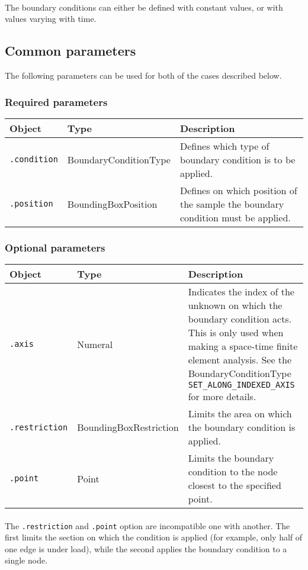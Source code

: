 \documentclass[10pt]{article}
\begin{document}
\paragraph{} The boundary conditions can either be defined with constant values, or with values varying with time.

\subsection{Common parameters}

The following parameters can be used for both of the cases described below.

\subsubsection*{Required parameters}

\begin{tabularx}{\textwidth}{llX}
\hline 
Object & Type & Description \\ 
\hline 
\verb+.condition+ & BoundaryConditionType & Defines which type of boundary condition is to be applied. \\ 
\verb+.position+ & BoundingBoxPosition & Defines on which position of the sample the boundary condition must be applied.\\ 
\hline 
\end{tabularx}

\subsubsection*{Optional parameters}

\begin{tabularx}{\textwidth}{llX}
\hline 
Object & Type & Description \\ 
\hline 
\verb+.axis+ & Numeral & Indicates the index of the unknown on which the boundary condition acts. This is only used when making a space-time finite element analysis. See the BoundaryConditionType \verb+SET_ALONG_INDEXED_AXIS+ for more details.\\ 
\verb+.restriction+ & BoundingBoxRestriction & Limits the area on which the boundary condition is applied.\\
\verb+.point+ & Point & Limits the boundary condition to the node closest to the specified point.\\
\hline 
\end{tabularx}

\paragraph{} The \verb+.restriction+ and \verb+.point+ option are incompatible one with another. The first limits the section on which the condition is applied (for example, only half of one edge is under load), while the second applies the boundary condition to a single node.
\end{document}
